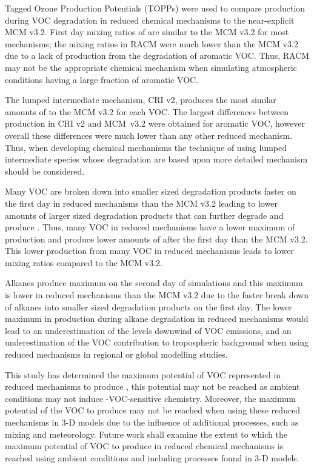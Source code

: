 Tagged Ozone Production Potentials (TOPPs) were used to compare  production during VOC degradation in reduced chemical mechanisms to the near-explicit MCM v3.2. 
First day mixing ratios of  are similar to the MCM v3.2 for most mechanisms; the  mixing ratios in RACM were much lower than the MCM v3.2 due to a lack of  production from the degradation of aromatic VOC.
Thus, RACM may not be the appropriate chemical mechanism when simulating atmospheric conditions having a large fraction of aromatic VOC.

The lumped intermediate mechanism, CRI v2, produces the most similar amounts of  to the MCM v3.2 for each VOC.
The largest differences between  production in CRI v2 and \mbox{MCM v3.2} were obtained for aromatic VOC, however overall these differences were much lower than any other reduced mechanism.
Thus, when developing chemical mechanisms the technique of using lumped intermediate species whose degradation are based upon more detailed mechanism should be considered.

Many VOC are broken down into smaller sized degradation products faster on the first day in reduced mechanisms than the MCM v3.2 leading to lower amounts of larger sized degradation products that can further degrade and produce .
Thus, many VOC in reduced mechanisms have a lower maximum of  production and produce lower amounts of  after the first day than the MCM v3.2.
This lower  production from many VOC in reduced mechanisms leads to lower  mixing ratios compared to the MCM v3.2.

Alkanes produce maximum  on the second day of simulations and this maximum is lower in reduced mechanisms than the MCM v3.2 due to the faster break down of alkanes into smaller sized degradation products on the first day.
The lower maximum in  production during alkane degradation in reduced mechanisms would lead to an underestimation of the  levels downwind of VOC emissions, and an underestimation of the VOC contribution to tropospheric background  when using reduced mechanisms in regional or global modelling studies.

This study has determined the maximum potential of VOC represented in reduced mechanisms to produce , this potential may not be reached as ambient  conditions may not induce -VOC-sensitive chemistry.
Moreover, the maximum potential of the VOC to produce  may not be reached when using these reduced mechanisms in 3-D models due to the influence of additional processes, such as mixing and meteorology.
Future work shall examine the extent to which the maximum potential of VOC to produce  in reduced chemical mechanisms is reached using ambient  conditions and including processes found in 3-D models.
